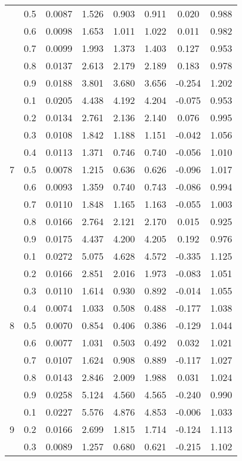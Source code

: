 \documentclass[11pt,a4paper]{report}
\begin{document}
\begin{longtable}{ | c | c || c | c | c | c | c | c | }
 & 0.5 & 0.0087 & 1.526 & 0.903 & 0.911 & 0.020 & 0.988 \\
 & 0.6 & 0.0098 & 1.653 & 1.011 & 1.022 & 0.011 & 0.982 \\
 & 0.7 & 0.0099 & 1.993 & 1.373 & 1.403 & 0.127 & 0.953 \\
 & 0.8 & 0.0137 & 2.613 & 2.179 & 2.189 & 0.183 & 0.978 \\
 & 0.9 & 0.0188 & 3.801 & 3.680 & 3.656 & -0.254 & 1.202 \\
 \hline
\multirow{9}{*}{7} & 0.1 & 0.0205 & 4.438 & 4.192 & 4.204 & -0.075 & 0.953 \\
 & 0.2 & 0.0134 & 2.761 & 2.136 & 2.140 & 0.076 & 0.995 \\
 & 0.3 & 0.0108 & 1.842 & 1.188 & 1.151 & -0.042 & 1.056 \\
 & 0.4 & 0.0113 & 1.371 & 0.746 & 0.740 & -0.056 & 1.010 \\
 & 0.5 & 0.0078 & 1.215 & 0.636 & 0.626 & -0.096 & 1.017 \\
 & 0.6 & 0.0093 & 1.359 & 0.740 & 0.743 & -0.086 & 0.994 \\
 & 0.7 & 0.0110 & 1.848 & 1.165 & 1.163 & -0.055 & 1.003 \\
 & 0.8 & 0.0166 & 2.764 & 2.121 & 2.170 & 0.015 & 0.925 \\
 & 0.9 & 0.0175 & 4.437 & 4.200 & 4.205 & 0.192 & 0.976 \\
 \hline
\multirow{9}{*}{8} & 0.1 & 0.0272 & 5.075 & 4.628 & 4.572 & -0.335 & 1.125 \\
 & 0.2 & 0.0166 & 2.851 & 2.016 & 1.973 & -0.083 & 1.051 \\
 & 0.3 & 0.0110 & 1.614 & 0.930 & 0.892 & -0.014 & 1.055 \\
 & 0.4 & 0.0074 & 1.033 & 0.508 & 0.488 & -0.177 & 1.038 \\
 & 0.5 & 0.0070 & 0.854 & 0.406 & 0.386 & -0.129 & 1.044 \\
 & 0.6 & 0.0077 & 1.031 & 0.503 & 0.492 & 0.032 & 1.021 \\
 & 0.7 & 0.0107 & 1.624 & 0.908 & 0.889 & -0.117 & 1.027 \\
 & 0.8 & 0.0143 & 2.846 & 2.009 & 1.988 & 0.031 & 1.024 \\
 & 0.9 & 0.0258 & 5.124 & 4.560 & 4.565 & -0.240 & 0.990 \\
 \hline
\multirow{9}{*}{9} & 0.1 & 0.0227 & 5.576 & 4.876 & 4.853 & -0.006 & 1.033 \\
 & 0.2 & 0.0166 & 2.699 & 1.815 & 1.714 & -0.124 & 1.113 \\
 & 0.3 & 0.0089 & 1.257 & 0.680 & 0.621 & -0.215 & 1.102 \\

\end{longtable}
\end{document}
